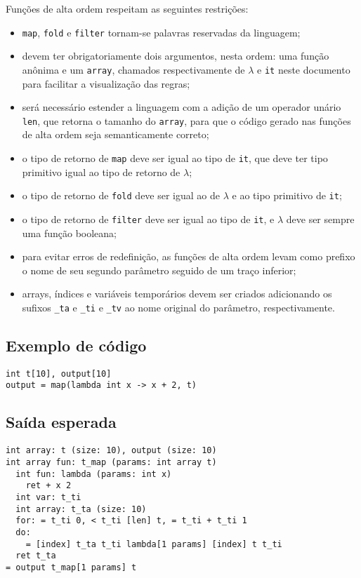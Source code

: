 \documentclass{sftex/sftex}
\newenvironment{smallitem}{
    \vspace{-1mm}
    \begin{itemize}
    \setlength{\parskip}{0pt}
    \setlength{\itemsep}{2pt}
}{
    \vspace{-2mm}
    \end{itemize}
}
\begin{document}
Funções de alta ordem respeitam as seguintes restrições:
\begin{smallitem}
    \item \verb!map!, \verb!fold! e \verb!filter! tornam-se palavras
        reservadas da linguagem;
    \item devem ter obrigatoriamente dois argumentos, nesta ordem: uma função
        anônima e um \verb!array!, chamados respectivamente
        de \texttt{$\lambda$} e \verb!it! neste documento para facilitar a
        visualização das regras;
    \item será necessário estender a linguagem com a adição de um operador
        unário \verb!len!, que retorna o tamanho do \verb!array!, para que
        o código gerado nas funções de alta ordem seja semanticamente correto;
    \item o tipo de retorno de \verb!map! deve ser igual ao tipo de
        \verb!it!, que deve ter tipo primitivo igual ao tipo de retorno
        de \texttt{$\lambda$};
    \item o tipo de retorno de \verb!fold! deve ser igual ao de
        \texttt{$\lambda$} e ao tipo primitivo de \verb!it!;
    \item o tipo de retorno de \verb!filter! deve ser igual ao tipo de
        \verb!it!, e \texttt{$\lambda$} deve ser sempre uma função booleana;
    \item para evitar erros de redefinição, as funções de alta ordem
        levam como prefixo o nome de seu segundo parâmetro seguido de
        um traço inferior;
    \item arrays, índices e variáveis temporários devem ser criados
        adicionando os sufixos \verb!_ta! e \verb!_ti! e \verb!_tv!
        ao nome original do parâmetro, respectivamente.
\end{smallitem}

\subsection{Exemplo de código}

\begin{verbatim}
int t[10], output[10]
output = map(lambda int x -> x + 2, t)
\end{verbatim}

\subsection{Saída esperada}

\begin{verbatim}
int array: t (size: 10), output (size: 10)
int array fun: t_map (params: int array t)
  int fun: lambda (params: int x)
    ret + x 2
  int var: t_ti
  int array: t_ta (size: 10)
  for: = t_ti 0, < t_ti [len] t, = t_ti + t_ti 1
  do:
    = [index] t_ta t_ti lambda[1 params] [index] t t_ti
  ret t_ta
= output t_map[1 params] t

\end{verbatim}
\end{document}
